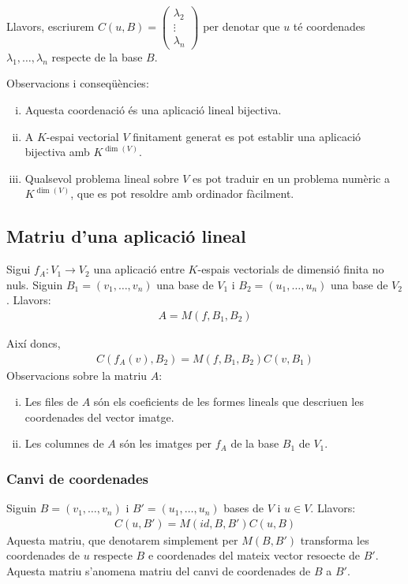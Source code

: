 Llavors, escriurem $C(u, B) = \begin{pmatrix} \lambda_{2} \\ \vdots \\ \lambda_{n} \end{pmatrix}$ per denotar que $u$ té coordenades $\lambda_{1}, \dots , \lambda_{n}$ respecte de la base $B$.

Observacions i conseqüències:
\begin{enumerate}[i)]
    \item Aquesta coordenació és una aplicació lineal bijectiva.
    \item A $K$-espai vectorial $V$ finitament generat es pot establir una aplicació bijectiva amb $K^{\dim (V)}$.
    \item Qualsevol problema lineal sobre $V$ es pot traduir en un problema numèric a $K^{\dim (V)}$, que es pot resoldre amb ordinador fàcilment.
\end{enumerate}

\subsection{Matriu d'una aplicació lineal}
Sigui $f_{A}: V_{1} \to V_{2}$ una aplicació entre $K$-espais vectorials de dimensió finita no nuls. Siguin $B_{1} = (v_{1}, \dots , v_{n})$ una base de $V_{1}$ i $B_{2} = (u_{1}, \dots , u_{n})$ una base de $V_{2}$. Llavors:
\begin{align}
    A = M (f, B_{1}, B_{2})
\end{align}

Així doncs, 
\begin{align}
    C(f_{A} (v), B_{2}) = M (f, B_{1}, B_{2}) C(v, B_{1})
\end{align}
Observacions sobre la matriu $A$:
\begin{enumerate}[i)]
    \item Les files de $A$ són els coeficients de les formes lineals que descriuen les coordenades del vector imatge.
    \item Les columnes de $A$ són les imatges per $f_{A}$ de la base $B_{1}$ de $V_{1}$.
\end{enumerate}

\subsubsection*{Canvi de coordenades}
Siguin $B = (v_{1}, \dots , v_{n})$ i $B' = (u_{1}, \dots , u_{n})$ bases de $V$ i $u \in V$. Llavors:
\begin{align}
    C(u, B') = M (id, B, B') C(u, B)
\end{align}
Aquesta matriu, que denotarem simplement per $M(B, B')$ transforma les coordenades de $u$ respecte $B$ e coordenades del mateix vector resoecte de $B'$. Aquesta matriu s'anomena matriu del canvi de coordenades de $B$ a $B'$.

